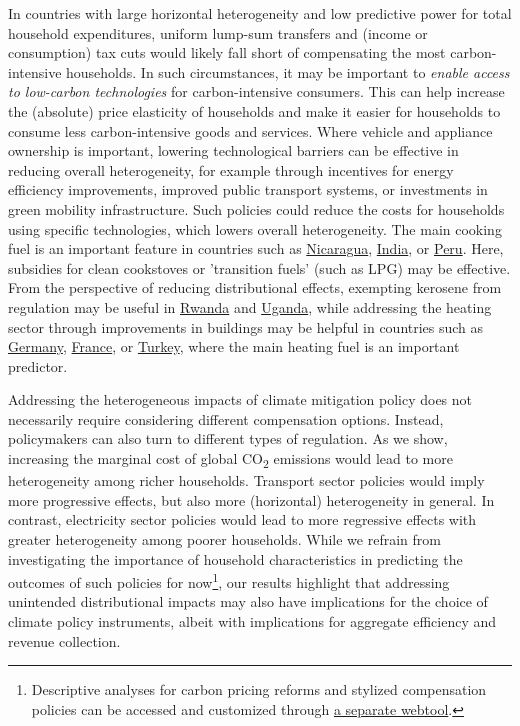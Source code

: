 \documentclass[12pt, a4paper]{article}
\begin{document}
In countries with large horizontal heterogeneity and low predictive power for total household expenditures, uniform lump-sum transfers and (income or consumption) tax cuts would likely fall short of compensating the most carbon-intensive households. In such circumstances, it may be important to \textit{enable access to low-carbon technologies} for carbon-intensive consumers. This can help increase the (absolute) price elasticity of households and make it easier for households to consume less carbon-intensive goods and services. Where vehicle and appliance ownership is important, lowering technological barriers can be effective in reducing overall heterogeneity, for example through incentives for energy efficiency improvements, improved public transport systems, or investments in green mobility infrastructure. Such policies could reduce the costs for households using specific technologies, which lowers overall heterogeneity. %
The main cooking fuel is an important feature in countries such as \hyperref[fig:5b_NIC]{Nicaragua}, \hyperref[fig:5b_IND]{India}, or \hyperref[fig:5b_PER]{Peru}. Here, subsidies for clean cookstoves or 'transition fuels' (such as LPG) may be effective. From the perspective of reducing distributional effects, exempting kerosene from regulation may be useful in \hyperref[fig:5b_RWA]{Rwanda} and \hyperref[fig:5b_UGA]{Uganda}, while addressing the heating sector through improvements in buildings may be helpful in countries such as \hyperref[fig:5b_DEU]{Germany}, \hyperref[fig:5b_FRA]{France}, or \hyperref[fig:5b_TUR]{Turkey}, where the main heating fuel is an important predictor. %

Addressing the heterogeneous impacts of climate mitigation policy does not necessarily require considering different compensation options. Instead, policymakers can also turn to different types of regulation. As we show, increasing the marginal cost of global CO\textsubscript{2} emissions would lead to more heterogeneity among richer households. Transport sector policies would imply more progressive effects, but also more (horizontal) heterogeneity in general. In contrast, electricity sector policies would lead to more regressive effects with greater heterogeneity among poorer households. While we refrain from investigating the importance of household characteristics in predicting the outcomes of such policies for now\footnote{Descriptive analyses for carbon pricing reforms and stylized compensation policies can be accessed and customized through \href{https://www.cpic-global.net/}{a separate webtool}.}, our results highlight that addressing unintended distributional impacts may also have implications for the choice of climate policy instruments, albeit with implications for aggregate efficiency and revenue collection. 
\end{document}

